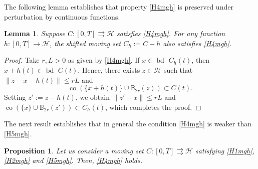 \documentclass[preprint,12pt]{elsarticle}
\renewcommand{\H}{\mathcal{H}}
\newcommand{\tto}{\rightrightarrows}
\newcommand{\bd}{{\operatorname{bd \ }}}
\theoremstyle{plain}
\newtheorem{lemma}[theorem]{Lemma}
\newtheorem{proposition}[theorem]{Proposition}
\theoremstyle{definition}
\theoremstyle{remark}
\begin{document}
	
	
The following lemma establishes that property \ref{H4mgh} is preserved under perturbation by continuous functions.
	\begin{lemma}\label{prop-preser-cm}
        Suppose $C\colon [0,T]\tto \H$ satisfies \ref{H4mgh}. For any function $h\colon [0,T]\to \H$, the shifted moving set $C_h := C-h$ also satisfies \ref{H4mgh}.
	\end{lemma}
	\begin{proof}
	Take $r,L>0$ as given by \ref{H4mgh}. If $x\in \bd C_h(t)$, then $x+h(t)\in\bd C(t)$. Hence, there exists $z\in\H$ such that $\|z-x-h(t)\|\leq rL$ and $$\operatorname{co}(\{x+h(t)\}\cup \mathbb{B}_{2r}(z))\subset C(t).$$ Setting $z':= z-h(t)$, we obtain $\|z'-x\|\leq rL$ and $\operatorname{co}(\{x\}\cup\mathbb{B}_{2r}(z'))\subset C_h(t)$, which completes the proof.
	\end{proof}
    The next result establishes that in general the condition \ref{H4mgh} is weaker than \ref{H5mgh}. 
    
    \begin{proposition}\label{H4-is-weaker-than-H5}
        Let us consider a moving set $C\colon [0,T]\tto \H$ satisfying \ref{H1mgh}, \ref{H2mgh} and \ref{H5mgh}. Then, \ref{H4mgh} holds.
    \end{proposition}
\end{document}
